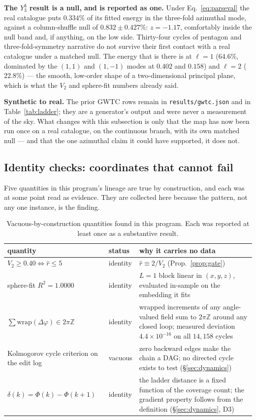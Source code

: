 \documentclass[11pt,a4paper]{article}
\theoremstyle{plain}
\theoremstyle{remark}
\theoremstyle{plain}
\begin{document}
\textbf{The $Y_3^3$ result is a null, and is reported as one.} Under Eq.~\eqref{eq:parseval} the real catalogue puts $0.334\%$ of its fitted energy in the three-fold azimuthal mode, against a column-shuffle null of $0.832\pm0.427\%$: $z=-1.17$, comfortably inside the null band and, if anything, on the low side. Thirty-four cycles of pentagon and three-fold-symmetry narrative do not survive their first contact with a real catalogue under a matched null. The energy that is there is at $\ell=1$ ($64.6\%$, dominated by the $(1,1)$ and $(1,-1)$ modes at $0.402$ and $0.158$) and $\ell=2$ ($22.8\%$) --- the smooth, low-order shape of a two-dimensional principal plane, which is what the $V_2$ and sphere-fit numbers already said.

\textbf{Synthetic to real.} The prior GWTC rows remain in \texttt{results/gwtc.json} and in Table~\ref{tab:ladder}; they are a generator's output and were never a measurement of the sky. What changes with this subsection is only that the map has now been run once on a real catalogue, on the continuous branch, with its own matched null --- and that the one azimuthal claim it could have supported, it does not.

\subsection{Identity checks: coordinates that cannot fail}
\label{sec:identities}

Five quantities in this program's lineage are true by construction, and each was
at some point read as evidence. They are collected here because the pattern, not
any one instance, is the finding.

\begin{table}[h]\centering\small
\begin{tabular}{llp{5.6cm}}
\toprule
quantity & status & why it carries no data \\
\midrule
$V_2\ge0.40\iff\hat r\le5$ & identity & $\hat r\equiv2/V_2$ (Prop.~\ref{prop:gate}) \\
sphere-fit $R^2=1.0000$ & identity & $L{=}1$ block linear in $(x,y,z)$, evaluated in-sample on the embedding it fits \\
$\sum\mathrm{wrap}(\Delta\varphi)\in2\pi\mathbb{Z}$ & identity & wrapped increments of any angle-valued field sum to $2\pi\mathbb{Z}$ around any closed loop; measured deviation $4.4\times10^{-16}$ on all $14{,}158$ cycles \\
Kolmogorov cycle criterion on the edit log & vacuous & zero backward edges make the chain a DAG; no directed cycle exists to test (\S\ref{sec:dynamics}) \\
$\delta(k)=\Phi(k)-\Phi(k{+}1)$ & identity & the ladder distance is a fixed function of the coverage count; the gradient property follows from the definition (\S\ref{sec:dynamics}, D3) \\
\bottomrule
\end{tabular}
\caption{Vacuous-by-construction quantities found in this program. Each was
reported at least once as a substantive result.}
\label{tab:identities}
\end{table}
\end{document}
